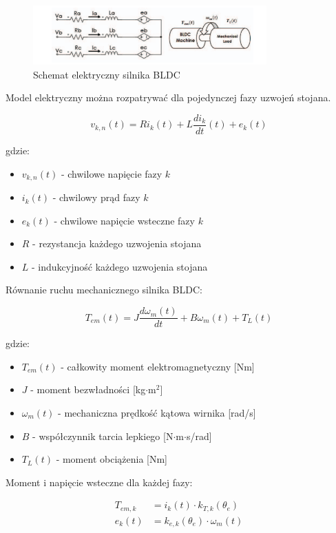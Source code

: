 \documentclass[11pt]{article}
\begin{document}
\begin{figure}[H]
\centering
\includegraphics[width=0.8\textwidth]{aun2_bldc_schematic.png}
\caption{Schemat elektryczny silnika BLDC}
\end{figure}

Model elektryczny można rozpatrywać dla pojedynczej fazy uzwojeń stojana.

\begin{equation}
v_{k,n}(t) = R i_k(t) + L \frac{di_k}{dt}(t) + e_k(t)
\label{eq:voltage}
\end{equation}

gdzie:
\begin{itemize}
\item $v_{k,n}(t)$ - chwilowe napięcie fazy $k$
\item $i_k(t)$ - chwilowy prąd fazy $k$
\item $e_k(t)$ - chwilowe napięcie wsteczne fazy $k$
\item $R$ - rezystancja każdego uzwojenia stojana
\item $L$ - indukcyjność każdego uzwojenia stojana
\end{itemize}

Równanie ruchu mechanicznego silnika BLDC:

\begin{equation}
T_{em}(t) = J \frac{d\omega_m(t)}{dt} + B \omega_m(t) + T_L(t)
\label{eq:mechanical}
\end{equation}

gdzie:
\begin{itemize}
\item $T_{em}(t)$ - całkowity moment elektromagnetyczny [Nm]
\item $J$ - moment bezwładności [kg$\cdot$m$^2$]
\item $\omega_m(t)$ - mechaniczna prędkość kątowa wirnika [rad/s]
\item $B$ - współczynnik tarcia lepkiego [N$\cdot$m$\cdot$s/rad]
\item $T_L(t)$ - moment obciążenia [Nm]
\end{itemize}

Moment i napięcie wsteczne dla każdej fazy:

\begin{align}
T_{em,k} &= i_k(t) \cdot k_{T,k}(\theta_e) \label{eq:phase_torque} \\
e_k(t) &= k_{e,k}(\theta_e) \cdot \omega_m(t) \label{eq:back_emf}
\end{align}
\end{document}
